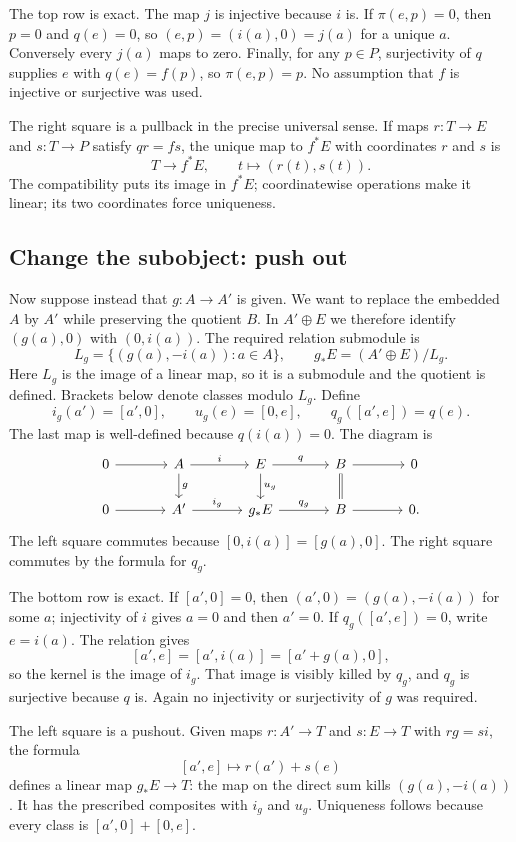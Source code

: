 The top row is exact. The map $j$ is injective because $i$ is. If
$\pi(e,p)=0$, then $p=0$ and $q(e)=0$, so $(e,p)=(i(a),0)=j(a)$
for a unique $a$. Conversely every $j(a)$ maps to zero. Finally, for
any $p\in P$, surjectivity of $q$ supplies $e$ with $q(e)=f(p)$, so
$\pi(e,p)=p$. No assumption that $f$ is injective or surjective was used.

The right square is a pullback in the precise universal sense. If maps
$r:T\to E$ and $s:T\to P$ satisfy $qr=fs$, the unique map to $f^*E$
with coordinates $r$ and $s$ is
\[
T\longrightarrow f^*E,\qquad t\longmapsto(r(t),s(t)).
\]
The compatibility puts its image in $f^*E$; coordinatewise operations
make it linear; its two coordinates force uniqueness.

\subsection{Change the subobject: push out}

Now suppose instead that $g:A\to A'$ is given. We want to replace the
embedded $A$ by $A'$ while preserving the quotient $B$. In $A'\oplus E$
we therefore identify $(g(a),0)$ with $(0,i(a))$. The required relation
submodule is
\[
L_g=\{(g(a),-i(a)):a\in A\},
\qquad
g_*E=(A'\oplus E)/L_g.
\]
Here $L_g$ is the image of a linear map, so it is a submodule and the
quotient is defined. Brackets below denote classes modulo $L_g$. Define
\[
i_g(a')=[a',0],\qquad u_g(e)=[0,e],\qquad q_g([a',e])=q(e).
\]
The last map is well-defined because $q(i(a))=0$. The diagram is
\[
\begin{tikzcd}[column sep=large]
0\arrow[r]&A\arrow[r,"i"]\arrow[d,"g"]
 &E\arrow[r,"q"]\arrow[d,"u_g"]&B\arrow[r]\arrow[d,equal]&0\\
0\arrow[r]&A'\arrow[r,"i_g"]&g_*E\arrow[r,"q_g"]&B\arrow[r]&0.
\end{tikzcd}
\]
The left square commutes because $[0,i(a)]=[g(a),0]$. The right square
commutes by the formula for $q_g$.

The bottom row is exact. If $[a',0]=0$, then
$(a',0)=(g(a),-i(a))$ for some $a$; injectivity of $i$ gives $a=0$
and then $a'=0$. If $q_g([a',e])=0$, write $e=i(a)$. The relation gives
\[
[a',e]=[a',i(a)]=[a'+g(a),0],
\]
so the kernel is the image of $i_g$. That image is visibly killed by
$q_g$, and $q_g$ is surjective because $q$ is. Again no injectivity or
surjectivity of $g$ was required.

The left square is a pushout. Given maps $r:A'\to T$ and $s:E\to T$
with $rg=si$, the formula
\[
[a',e]\longmapsto r(a')+s(e)
\]
defines a linear map $g_*E\to T$: the map on the direct sum kills
$(g(a),-i(a))$. It has the prescribed composites with $i_g$ and $u_g$.
Uniqueness follows because every class is $[a',0]+[0,e]$.

